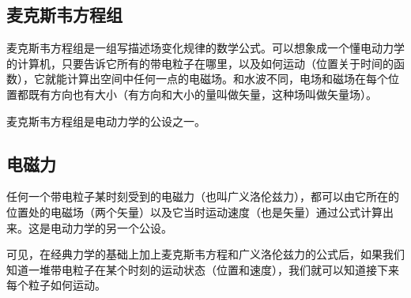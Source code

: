 \subsection{麦克斯韦方程组}
麦克斯韦方程组是一组写描述场变化规律的数学公式。可以想象成一个懂电动力学的计算机，只要告诉它所有的带电粒子在哪里，以及如何运动（位置关于时间的函数），它就能计算出空间中任何一点的电磁场。和水波不同，电场和磁场在每个位置都既有方向也有大小（有方向和大小的量叫做矢量，这种场叫做矢量场）。

麦克斯韦方程组是电动力学的公设之一。

\subsection{电磁力}
任何一个带电粒子某时刻受到的电磁力（也叫广义洛伦兹力），都可以由它所在的位置处的电磁场（两个矢量）以及它当时运动速度（也是矢量）通过公式计算出来。这是电动力学的另一个公设。

可见，在经典力学的基础上加上麦克斯韦方程和广义洛伦兹力的公式后，如果我们知道一堆带电粒子在某个时刻的运动状态（位置和速度），我们就可以知道接下来每个粒子如何运动。
